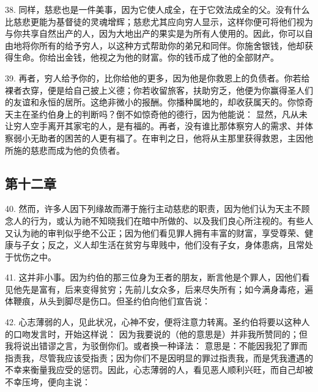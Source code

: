 38. 同样，慈悲也是一件美事，因为它使人成全，在于它效法成全的父。没有什么比慈悲更能为基督徒的灵魂增辉；慈悲尤其应向穷人显示，这样你便可将他们视为与你共享自然出产的人，因为大地出产的果实是为所有人使用的。因此，你可以自由地将你所有的给予穷人，以这种方式帮助你的弟兄和同伴。你施舍银钱，他却获得生命。你给出金钱，他视之为他的财富。你的钱币成了他的全部财产。\par

39. 再者，穷人给予你的，比你给他的更多，因为他是你救恩上的负债者。你若给裸者衣穿，便是给自己披上义德；你若收留旅客，扶助穷乏，他便为你赢得圣人们的友谊和永恒的居所。这绝非微小的报酬。你播种属地的，却收获属天的。你惊奇天主在圣约伯身上的判断吗？倒不如惊奇他的德行，因为他能说： 显然，凡从未让穷人空手离开其家宅的人，是有福的。再者，没有谁比那体察穷人的需求、并体察弱小无助者的困苦的人更有福了。在审判之日，他将从主那里获得救恩，主因他所施的慈悲而成为他的负债者。\par


\subsection{第十二章}

\par

40. 然而，许多人因下列缘故而滞于施行主动慈悲的职责，因为他们认为天主不顾念人的行为，或认为祂不知晓我们在暗中所做的、以及我们良心所注视的。有些人又认为祂的审判似乎绝不公正；因为他们看见罪人拥有丰富的财富，享受尊荣、健康与子女；反之，义人却生活在贫穷与卑贱中，他们没有子女，身体患病，且常处于忧伤之中。\par

41. 这并非小事。因为约伯的那三位身为王者的朋友，断言他是个罪人，因他们看见他先是富有，后来变得贫穷；先前儿女众多，后来尽失所有；如今满身毒疮，遍体鞭痕，从头到脚尽是伤口。但圣约伯向他们宣告说：\par

42. 心志薄弱的人，见此状况，心神不安，便将注意力转离。圣约伯将要以这种人的口吻发言时，开始这样说： 因为我要说的（他的意思是）并非我所赞同的；但我将说出错谬之言，为驳倒你们。或者换一种译法： 意思是：不能因我犯了罪而指责我，尽管我应该受指责；因为你们不是因明显的罪过指责我，而是凭我遭遇的不幸来衡量我应受的惩罚。因此，心志薄弱的人，看见恶人顺利兴旺，而自己却被不幸压垮，便向主说： \par

